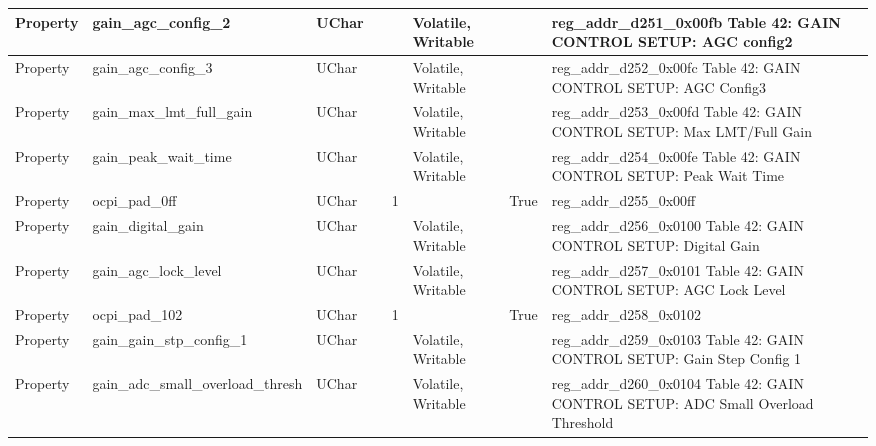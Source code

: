 \documentclass{article}
\begin{document}
\begin{scriptsize}
\begin{longtable}{|p{2cm}|p{5cm}|p{1cm}|p{2cm}|p{2cm}|p{1.75cm}|p{1.5cm}|p{5.1cm}|}
  \hline
  Property & gain\_agc\_config\_2                                     & UChar &                  &                  & Volatile,  Writable &         & reg\_addr\_d251\_0x00fb Table 42: GAIN CONTROL SETUP: AGC config2 \\
  \hline
  Property & gain\_agc\_config\_3                                     & UChar &                  &                  & Volatile,  Writable &         & reg\_addr\_d252\_0x00fc Table 42: GAIN CONTROL SETUP: AGC Config3 \\
  \hline
  Property & gain\_max\_lmt\_full\_gain                               & UChar &                  &                  & Volatile,  Writable &         & reg\_addr\_d253\_0x00fd Table 42: GAIN CONTROL SETUP: Max LMT/Full Gain \\
  \hline
  Property & gain\_peak\_wait\_time                                   & UChar &                  &                  & Volatile,  Writable &         & reg\_addr\_d254\_0x00fe Table 42: GAIN CONTROL SETUP: Peak Wait Time \\
  \hline
  Property & ocpi\_pad\_0ff                                           & UChar &                  & 1                &                     & True    & reg\_addr\_d255\_0x00ff \\
  \hline
  Property & gain\_digital\_gain                                      & UChar &                  &                  & Volatile,  Writable &         & reg\_addr\_d256\_0x0100 Table 42: GAIN CONTROL SETUP: Digital Gain \\
  \hline
  Property & gain\_agc\_lock\_level                                   & UChar &                  &                  & Volatile,  Writable &         & reg\_addr\_d257\_0x0101 Table 42: GAIN CONTROL SETUP: AGC Lock Level \\
  \hline
  Property & ocpi\_pad\_102                                           & UChar &                  & 1                &                     & True    & reg\_addr\_d258\_0x0102 \\
  \hline
  Property & gain\_gain\_stp\_config\_1                               & UChar &                  &                  & Volatile,  Writable &         & reg\_addr\_d259\_0x0103 Table 42: GAIN CONTROL SETUP: Gain Step Config 1 \\
  \hline
  Property & gain\_adc\_small\_overload\_thresh                       & UChar &                  &                  & Volatile,  Writable &         & reg\_addr\_d260\_0x0104 Table 42: GAIN CONTROL SETUP: ADC Small Overload Threshold \\

\end{longtable}
\end{scriptsize}
\end{document}
